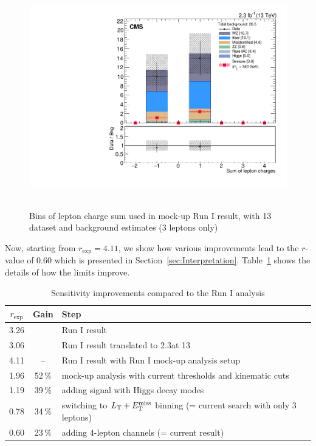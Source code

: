 \begin{figure}
\begin{center}
	\includegraphics[width=.7\textwidth]{Results/L3Tau0_Q}\
	\caption{Bins of lepton charge sum used in mock-up Run I result, with 13\,\TeV dataset and background estimates (3 leptons only)
	\label{fig:app:RunI}}
\end{center}
\end{figure}

Now, starting from $r_\textrm{exp} = 4.11$, we show how various improvements lead to the $r$-value of 0.60 which is presented in Section~\ref{sec:Interpretation}. Table~\ref{tab:improvements} shows the details of how the limits improve.

\begin{table}[h]
\centering
\caption{Sensitivity improvements compared to the Run I analysis} \label{tab:improvements}
\begin{tabular}{c c l}
\hline\hline
$r_\textrm{exp}$ & Gain & Step \\
\hline
\hline
3.26 & & Run I result \\
3.06 & & Run I result translated to 2.3\fbinv at 13\,\TeV\\
\hline
4.11 & -- & Run I result with Run I mock-up analysis setup \\
1.96 & 52\,\% & mock-up analysis with current \pt thresholds and kinematic cuts \\
1.19 & 39\,\% & adding signal with Higgs decay modes \\
0.78 & 34\,\% & switching to $L_\textrm{T} + E_{\mathrm{T}}^{\text{miss}}$ binning (= current search with only 3 leptons) \\
0.60 & 23\,\% & adding 4-lepton channels (= current result) \\
\end{tabular}
\end{table}
